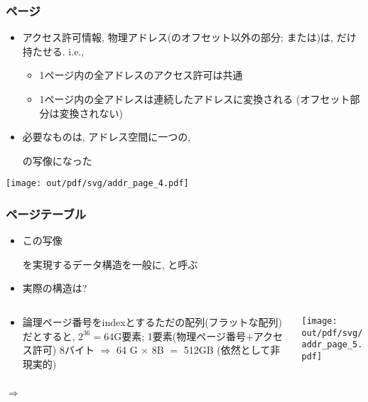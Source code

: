 \documentclass[12pt,dvipdfmx]{beamer}
\begin{document}
\begin{frame}
  \frametitle{ページ}
  \begin{itemize}
  \item アクセス許可情報, 物理アドレス(のオフセット以外の部分;
    または)は,
    だけ持たせる. i.e.,
    \begin{itemize}
    \item 1ページ内の全アドレスのアクセス許可は共通
    \item 1ページ内の全アドレスは連続したアドレスに変換される
      (オフセット部分は変換されない)
    \end{itemize}
    
  \item 必要なものは, アドレス空間に一つの,
    \begin{center}
    \end{center}
    の写像になった
  \end{itemize}
  \begin{center}
    \texttt{[image: out/pdf/svg/addr\_page\_4.pdf]}
  \end{center}
\end{frame}

\begin{frame}
  \frametitle{ページテーブル}
  \begin{itemize}
  \item この写像

    \begin{center}
    \end{center}

    を実現するデータ構造を一般に, と呼ぶ
      
  \item 実際の構造は?
  \end{itemize}
  
  \begin{columns}
    \begin{column}{0.6\textwidth}
      \begin{itemize}
      \item   論理ページ番号をindexとするただの配列(フラットな配列)だとすると,
        $2^{36} = 64\mbox{G}$要素; 1要素(物理ページ番号$+$アクセス許可) 8バイト
        $\Rightarrow$ 64 G $\times$ 8B $=$ 512GB (依然として非現実的)
      \end{itemize}
    \end{column}
    \begin{column}{0.5\textwidth}
      \begin{center}
        \texttt{[image: out/pdf/svg/addr\_page\_5.pdf]}
      \end{center}
    \end{column}
  \end{columns}

  $\Rightarrow$ 
  
\end{frame}
\end{document}
